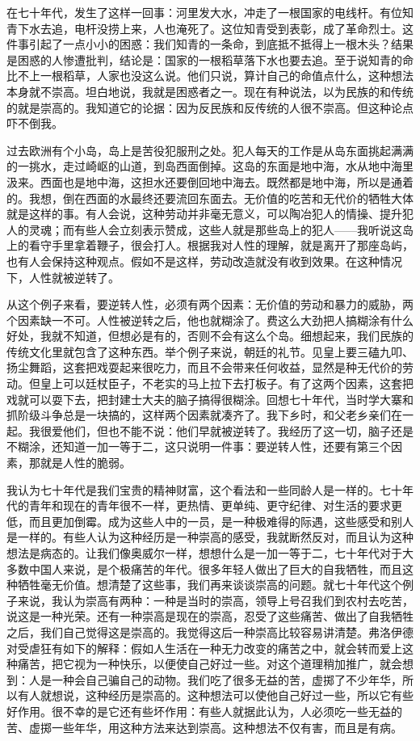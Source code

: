 在七十年代，发生了这样一回事：河里发大水，冲走了一根国家的电线杆。有位知青下水去追，电杆没捞上来，人也淹死了。这位知青受到表彰，成了革命烈士。这件事引起了一点小小的困惑：我们知青的一条命，到底抵不抵得上一根木头？结果是困惑的人惨遭批判，结论是：国家的一根稻草落下水也要去追。至于说知青的命比不上一根稻草，人家也没这么说。他们只说，算计自己的命值点什么，这种想法本身就不崇高。坦白地说，我就是困惑者之一。现在有种说法，以为民族的和传统的就是崇高的。我知道它的论据：因为反民族和反传统的人很不崇高。但这种论点吓不倒我。 

过去欧洲有个小岛，岛上是苦役犯服刑之处。犯人每天的工作是从岛东面挑起满满的一挑水，走过崎岖的山道，到岛西面倒掉。这岛的东面是地中海，水从地中海里汲来。西面也是地中海，这担水还要倒回地中海去。既然都是地中海，所以是通着的。我想，倒在西面的水最终还要流回东面去。无价值的吃苦和无代价的牺牲大体就是这样的事。有人会说，这种劳动并非毫无意义，可以陶冶犯人的情操、提升犯人的灵魂；而有些人会立刻表示赞成，这些人就是那些岛上的犯人——我听说这岛上的看守手里拿着鞭子，很会打人。根据我对人性的理解，就是离开了那座岛屿，也有人会保持这种观点。假如不是这样，劳动改造就没有收到效果。在这种情况下，人性就被逆转了。 

从这个例子来看，要逆转人性，必须有两个因素：无价值的劳动和暴力的威胁，两个因素缺一不可。人性被逆转之后，他也就糊涂了。费这么大劲把人搞糊涂有什么好处，我就不知道，但想必是有的，否则不会有这么个岛。细想起来，我们民族的传统文化里就包含了这种东西。举个例子来说，朝廷的礼节。见皇上要三磕九叩、扬尘舞蹈，这套把戏耍起来很吃力，而且不会带来任何收益，显然是种无代价的劳动。但皇上可以廷杖臣子，不老实的马上拉下去打板子。有了这两个因素，这套把戏就可以耍下去，把封建士大夫的脑子搞得很糊涂。回想七十年代，当时学大寨和抓阶级斗争总是一块搞的，这样两个因素就凑齐了。我下乡时，和父老乡亲们在一起。我很爱他们，但也不能不说：他们早就被逆转了。我经历了这一切，脑子还是不糊涂，还知道一加一等于二，这只说明一件事：要逆转人性，还要有第三个因素，那就是人性的脆弱。 

我认为七十年代是我们宝贵的精神财富，这个看法和一些同龄人是一样的。七十年代的青年和现在的青年很不一样，更热情、更单纯、更守纪律、对生活的要求更低，而且更加倒霉。成为这些人中的一员，是一种极难得的际遇，这些感受和别人是一样的。有些人认为这种经历是一种崇高的感受，我就断然反对，而且认为这种想法是病态的。让我们像奥威尔一样，想想什么是一加一等于二，七十年代对于大多数中国人来说，是个极痛苦的年代。很多年轻人做出了巨大的自我牺牲，而且这种牺牲毫无价值。想清楚了这些事，我们再来谈谈崇高的问题。就七十年代这个例子来说，我认为崇高有两种：一种是当时的崇高，领导上号召我们到农村去吃苦，说这是一种光荣。还有一种崇高是现在的崇高，忍受了这些痛苦、做出了自我牺牲之后，我们自己觉得这是崇高的。我觉得这后一种崇高比较容易讲清楚。弗洛伊德对受虐狂有如下的解释：假如人生活在一种无力改变的痛苦之中，就会转而爱上这种痛苦，把它视为一种快乐，以便使自己好过一些。对这个道理稍加推广，就会想到：人是一种会自己骗自己的动物。我们吃了很多无益的苦，虚掷了不少年华，所以有人就想说，这种经历是崇高的。这种想法可以使他自己好过一些，所以它有些好作用。很不幸的是它还有些坏作用：有些人就据此认为，人必须吃一些无益的苦、虚掷一些年华，用这种方法来达到崇高。这种想法不仅有害，而且是有病。 

